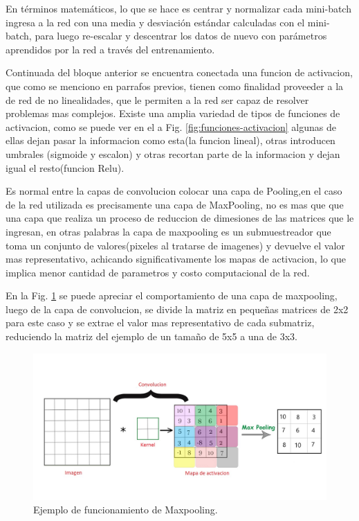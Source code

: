 En términos matemáticos, lo que se hace es centrar y normalizar cada mini-batch ingresa a la red con una media y
desviación estándar calculadas con el mini-batch, para luego re-escalar y descentrar los datos de nuevo con parámetros
aprendidos por la red a través del entrenamiento.

Continuada del bloque anterior se encuentra conectada una funcion de activacion, que como se menciono en parrafos previos, tienen como finalidad
proveeder a la de red de no linealidades, que le permiten a la red ser capaz de resolver problemas mas complejos. Existe una amplia variedad
de tipos de funciones de activacion, como se puede ver en el a Fig. \ref{fig:funciones-activacion} algunas de ellas dejan pasar la informacion
como esta(la funcion lineal), otras introducen umbrales (sigmoide y escalon) y otras recortan parte de la informacion y dejan igual el resto(funcion Relu).

Es normal entre la capas de convolucion colocar una capa de Pooling,en el caso de la red utilizada es precisamente una capa de MaxPooling,
no es mas que que una capa que realiza un proceso de reduccion de dimesiones de las matrices que le ingresan, en otras palabras la capa de maxpooling
es un submuestreador que toma un conjunto de valores(pixeles al tratarse de imagenes) y devuelve el valor mas representativo, achicando significativamente
los mapas de activacion, lo que implica menor cantidad de parametros y costo computacional de la red.

En la Fig. \ref{fig:ejemplo-mp} se puede apreciar el comportamiento de una capa de maxpooling, luego de la capa de convolucion, se divide la matriz
en pequeñas matrices de 2x2 para este caso y se extrae el valor mas representativo de cada submatriz, reduciendo la matriz del ejemplo de un tamaño de
5x5 a una de 3x3.
\begin{figure}
    \centering
    \includegraphics[width=1\textwidth]{imgs/ej-maxpooling.jpg}
    \caption{Ejemplo de funcionamiento de Maxpooling.}
    \label{fig:ejemplo-mp}
\end{figure}


